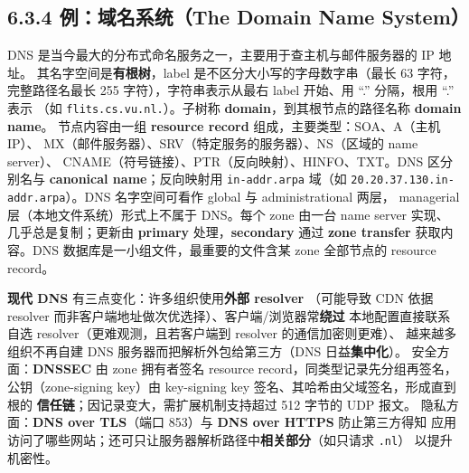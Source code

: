 \subsection*{6.3.4 例：域名系统（The Domain Name System）}
DNS 是当今最大的分布式命名服务之一，主要用于查主机与邮件服务器的 IP 地址。
其名字空间是\textbf{有根树}，label 是不区分大小写的字母数字串（最长 63 字符，
完整路径名最长 255 字符），字符串表示从最右 label 开始、用 “.” 分隔，根用 “.” 表示
（如 \texttt{flits.cs.vu.nl.}）。子树称 \textbf{domain}，到其根节点的路径名称 \textbf{domain name}。
节点内容由一组 \textbf{resource record} 组成，主要类型：SOA、A（主机 IP）、
MX（邮件服务器）、SRV（特定服务的服务器）、NS（区域的 name server）、
CNAME（符号链接）、PTR（反向映射）、HINFO、TXT。DNS 区分别名与
\textbf{canonical name}；反向映射用 \texttt{in-addr.arpa} 域（如
\texttt{20.20.37.130.in-addr.arpa}）。DNS 名字空间可看作 global 与 administrational 两层，
managerial 层（本地文件系统）形式上不属于 DNS。每个 zone 由一台 name server 实现、
几乎总是复制；更新由 \textbf{primary} 处理，\textbf{secondary} 通过 \textbf{zone transfer}
获取内容。DNS 数据库是一小组文件，最重要的文件含某 zone 全部节点的 resource record。

\medskip\noindent \textbf{现代 DNS} 有三点变化：许多组织使用\textbf{外部 resolver}
（可能导致 CDN 依据 resolver 而非客户端地址做次优选择）、客户端/浏览器常\textbf{绕过}
本地配置直接联系自选 resolver（更难观测，且若客户端到 resolver 的通信加密则更难）、
越来越多组织不再自建 DNS 服务器而把解析外包给第三方（DNS 日益\textbf{集中化}）。
安全方面：\textbf{DNSSEC} 由 zone 拥有者签名 resource record，同类型记录先分组再签名，
公钥（zone-signing key）由 key-signing key 签名、其哈希由父域签名，形成直到根的
\textbf{信任链}；因记录变大，需扩展机制支持超过 512 字节的 UDP 报文。
隐私方面：\textbf{DNS over TLS}（端口 853）与 \textbf{DNS over HTTPS} 防止第三方得知
应用访问了哪些网站；还可只让服务器解析路径中\textbf{相关部分}（如只请求 \texttt{.nl}）
以提升机密性。

\begin{closeread}
\end{closeread}

\begin{closeread}
\end{closeread}

